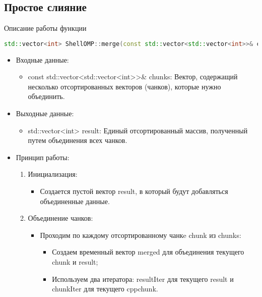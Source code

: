 \documentclass[]{article}
\theoremstyle{remark}
\theoremstyle{definition}
\newcommand{\cpp}{\textit{}}
\begin{document}
\subsection{Простое слияние}

\par Описание работы функции
\begin{lstlisting}[language=C++]
std::vector<int> ShellOMP::merge(const std::vector<std::vector<int>>& chunks):
\end{lstlisting}

\begin{itemize}
    \item Входные данные:

    \begin{itemize}
        \item \cpp{const std::vector<std::vector<int>>\& chunks}: Вектор, содержащий несколько отсортированных векторов (чанков), которые нужно объединить.
    \end{itemize}

    \item Выходные данные:

    \begin{itemize}
        \item \cpp{std::vector<int> result}: Единый отсортированный массив, полученный путем объединения всех чанков.
    \end{itemize}
    
    \item Принцип работы:
    \begin{enumerate}
        
        \item Инициализация:
        \begin{itemize}
            \item Создается пустой вектор \cpp{result}, в который будут добавляться объединенные данные.
        \end{itemize}
        
        \item Объединение чанков:
        \begin{itemize}
            \item Проходим по каждому отсортированному чанкe \cpp{chunk} из \cpp{chunks}:
            \begin{itemize}
                \item Создаем временный вектор \cpp{merged} для объединения текущего \cpp{chunk} и \cpp{result};
                \item Используем два итератора: \cpp{resultIter} для текущего \cpp{result} и \cpp{chunkIter} для текущего cpp{chunk}.
            \end{itemize}
        \end{itemize}


\end{enumerate}
\end{itemize}
\end{document}
